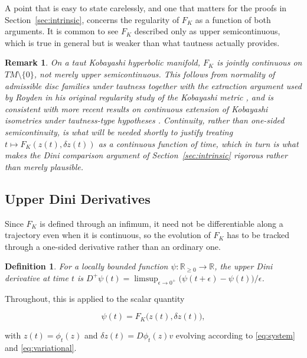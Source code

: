 \documentclass[preprint,12pt,authoryear]{elsarticle}
\newtheorem{remark}{Remark}
\newtheorem{definition}{Definition}
\begin{document}
A point that is easy to state carelessly, and one that matters for the proofs in Section~\ref{sec:intrinsic}, concerns the regularity of $F_K$ as a function of both arguments. It is common to see $F_K$ described only as upper semicontinuous, which is true in general but is weaker than what tautness actually provides.

\begin{remark}
\label{rem:continuity}
On a taut Kobayashi hyperbolic manifold, $F_K$ is jointly continuous on $TM\setminus\{0\}$, not merely upper semicontinuous. This follows from normality of admissible disc families under tautness together with the extraction argument used by Royden in his original regularity study of the Kobayashi metric \cite{royden1971remarks}, and is consistent with more recent results on continuous extension of Kobayashi isometries under tautness-type hypotheses \cite{maitra2020continuous}. Continuity, rather than one-sided semicontinuity, is what will be needed shortly to justify treating $t\mapsto F_K(z(t),\delta z(t))$ as a continuous function of time, which in turn is what makes the Dini comparison argument of Section~\ref{sec:intrinsic} rigorous rather than merely plausible.
\end{remark}

\subsection{Upper Dini Derivatives}

Since $F_K$ is defined through an infimum, it need not be differentiable along a trajectory even when it is continuous, so the evolution of $F_K$ has to be tracked through a one-sided derivative rather than an ordinary one.

\begin{definition}
\label{def:dini}
For a locally bounded function $\psi:\mathbb{R}_{\ge0}\to\mathbb{R}$, the upper Dini derivative at time $t$ is $D^+\psi(t)=\limsup_{\epsilon\to0^+}\big(\psi(t+\epsilon)-\psi(t)\big)/\epsilon$.
\end{definition}

Throughout, this is applied to the scalar quantity

\begin{equation}
\psi(t) = F_K\big(z(t),\delta z(t)\big), \label{eq:psi}
\end{equation}

with $z(t)=\phi_t(z)$ and $\delta z(t)=D\phi_t(z)v$ evolving according to \eqref{eq:system} and \eqref{eq:variational}.
\end{document}
